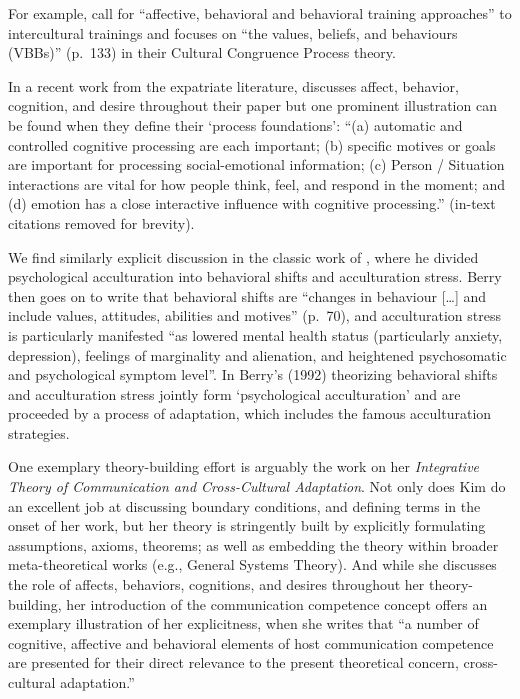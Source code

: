 For example, \citet[][]{Bhawuk2006} call for ``affective, behavioral and
behavioral training approaches'' to intercultural trainings
\citep[][Table 30.3]{Bhawuk2006} and \citet[][]{Robinson2019} focuses on
``the values, beliefs, and behaviours (VBBs)'' (p.~133) in their
Cultural Congruence Process theory.

In a recent work from the expatriate literature, \citet[][]{Maertz2016}
discusses affect, behavior, cognition, and desire throughout their paper
but one prominent illustration can be found when they define their
`process foundations': ``(a) automatic and controlled cognitive
processing are each important; (b) specific motives or goals are
important for processing social-emotional information; (c) Person /
Situation interactions are vital for how people think, feel, and respond
in the moment; and (d) emotion has a close interactive influence with
cognitive processing.'' (in-text citations removed for brevity).

We find similarly explicit discussion in the classic work of
\citet[][]{Berry1992}, where he divided psychological acculturation into
behavioral shifts and acculturation stress. Berry then goes on to write
that behavioral shifts are ``changes in behaviour {[}\ldots{]} and
include values, attitudes, abilities and motives'' (p.~70), and
acculturation stress is particularly manifested ``as lowered mental
health status (particularly anxiety, depression), feelings of
marginality and alienation, and heightened psychosomatic and
psychological symptom level''. In Berry's (1992) theorizing behavioral
shifts and acculturation stress jointly form `psychological
acculturation' and are proceeded by a process of adaptation, which
includes the famous acculturation strategies.

One exemplary theory-building effort is arguably the work
\citet[][]{Kim1988} on her
\textit{Integrative Theory of Communication and Cross-Cultural Adaptation}.
Not only does Kim do an excellent job at discussing boundary conditions,
and defining terms in the onset of her work, but her theory is
stringently built by explicitly formulating assumptions, axioms,
theorems; as well as embedding the theory within broader
meta-theoretical works (e.g., General Systems Theory). And while she
discusses the role of affects, behaviors, cognitions, and desires
throughout her theory-building, her introduction of the communication
competence concept offers an exemplary illustration of her explicitness,
when she writes that ``a number of cognitive, affective and behavioral
elements of host communication competence are presented for their direct
relevance to the present theoretical concern, cross-cultural
adaptation.''

